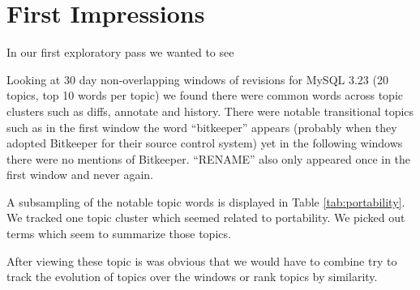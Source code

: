 \documentclass[times, 10pt,twocolumn]{article}
\begin{document}
\section{First Impressions}

In our first exploratory pass we wanted to see 

Looking at 30 day non-overlapping windows of revisions for MySQL 3.23
(20 topics, top 10 words per topic) we found there were common words
across topic clusters such as diffs, annotate and history. There were
notable transitional topics such as in the first window the word
``bitkeeper'' appears (probably when they adopted Bitkeeper for their
source control system) yet in the following windows there were no
mentions of Bitkeeper. ``RENAME'' also only appeared once in the first
window and never again.

A subsampling of the notable topic words is displayed in Table
\ref{tab:portability}. We tracked one topic cluster which seemed
related to portability. We picked out terms which seem to summarize
those topics.


After viewing these topic is was obvious that we would have to combine
try to track the evolution of topics over the windows or rank topics
by similarity.

\end{document}
